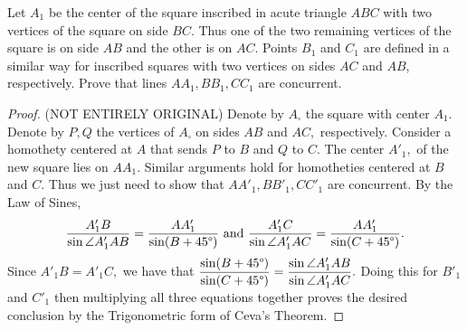 \documentclass[letterpaper,oneside]{scrartcl}
\begin{document}
\begin{problem*}
  [3.28 (Shortlist 2001/G1)]
  Let $A_1$ be the center of the square inscribed in acute triangle $ABC$ with two vertices of the square on side $BC$. Thus one of the two remaining vertices of the square is on side $AB$ and the other is on $AC$. Points $B_1$ and $C_1$ are defined in a similar way for inscribed squares with two vertices on sides $AC$ and $AB$, respectively. Prove that lines $AA_1, BB_1, CC_1$ are concurrent.
\end{problem*}

\begin{proof}
  (NOT ENTIRELY ORIGINAL) Denote by $A_{\square}$ the square with center $A_1$. Denote by $P,Q$ the vertices of $A_{\square}$ on sides $AB$ and $AC,$ respectively. Consider a homothety centered at $A$ that sends $P$ to $B$ and $Q$ to $C.$ The center $A'_1,$ of the new square lies on $AA_1.$ Similar arguments hold for homotheties centered at $B$ and $C.$ Thus we just need to show that $AA'_1, BB'_1, CC'_1$ are concurrent. By the Law of Sines,
  $$\frac{A'_1B}{\sin\angle A'_1AB} = \frac{AA'_1}{\sin(B+45\degree)} \text{ and } \frac{A'_1C}{\sin\angle A'_1AC} = \frac{AA'_1}{\sin(C+45\degree)}.$$
  Since $A'_1B = A'_1C,$ we have that $\displaystyle \frac{\sin(B+45\degree)}{\sin(C+45\degree)} = \frac{\sin\angle A'_1AB}{\sin\angle A'_1AC}.$ Doing this for $B'_1$ and $C'_1$ then multiplying all three equations together proves the desired conclusion by the Trigonometric form of Ceva's Theorem. 
\end{proof}
\newpage
\end{document}
